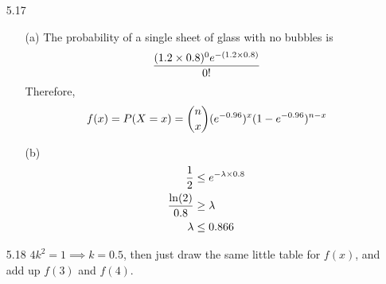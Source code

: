 \documentclass[english, 11pt]{article}
\begin{document}
\begin{itemize}
    \item[5.17]
    \begin{itemize}
      \item[(a)] The probability of a single sheet of glass with no bubbles is
      \[\frac{(1.2\times 0.8)^0e^{-(1.2\times0.8)}}{0!} \]
      Therefore,
      \[ f(x) = P(X = x) = {n \choose x}(e^{-0.96})^x(1-e^{-0.96})^{n-x} \]
      \item[(b)]
      \begin{align*}
        \frac{1}{2} & \leq e^{-\lambda \times 0.8} \\
        \frac{\ln(2)}{0.8} & \geq \lambda \\
        \lambda & \leq 0.866
      \end{align*}
    \end{itemize}

    \item[5.18]$ 4k^2 = 1 \implies k = 0.5$, then just draw the same little table for $f(x)$, and add up $f(3)$ and $f(4)$.


\end{itemize}
\end{document}
